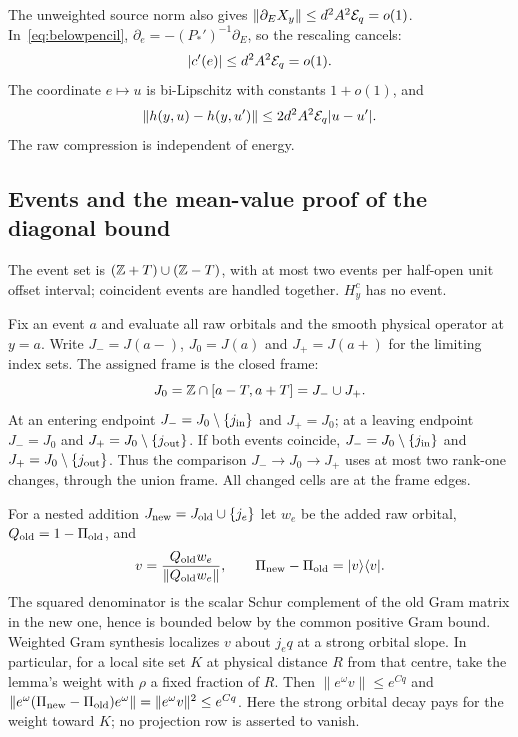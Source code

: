 The unweighted source norm also gives
$\|\partial_EX_y\|\le d^2A^2\mathcal E_q=o(1)$.
In~\eqref{eq:belowpencil}, $\partial_e=-(P_*')^{-1}\partial_E$, so the rescaling cancels:
\[
 |c'(e)|\le d^2A^2\mathcal E_q=o(1).
\]
The coordinate $e\mapsto u$ is bi-Lipschitz with constants $1+o(1)$, and
\begin{equation}\label{eq:belowenergyLip}
 \|h(y,u)-h(y,u')\|\le2d^2A^2\mathcal E_q|u-u'|.
\end{equation}
The raw compression is independent of energy.

\subsection{Events and the mean-value proof of the diagonal bound}
The event set is $(\mathbb Z+T)\cup(\mathbb Z-T)$, with at most two events per half-open unit offset interval; coincident events are handled together. $H_y^c$ has no event.

Fix an event $a$ and evaluate all raw orbitals and the smooth physical operator at $y=a$. Write $J_-=J(a-)$, $J_0=J(a)$ and $J_+=J(a+)$ for the limiting index sets. The assigned frame is the closed frame:
\[
 J_0=\mathbb Z\cap[a-T,a+T]=J_-\cup J_+.
\]
At an entering endpoint $J_-=J_0\setminus\{j_{\rm in}\}$ and $J_+=J_0$; at a leaving endpoint $J_-=J_0$ and $J_+=J_0\setminus\{j_{\rm out}\}$. If both events coincide, $J_-=J_0\setminus\{j_{\rm in}\}$ and $J_+=J_0\setminus\{j_{\rm out}\}$.
Thus the comparison $J_-\to J_0\to J_+$ uses at most two rank-one changes, through the union frame. All changed cells are at the frame edges.

For a nested addition $J_{\rm new}=J_{\rm old}\cup\{j_e\}$ let $w_e$ be the added raw orbital, $Q_{\rm old}=1-\Pi_{\rm old}$, and
\[
 v=\frac{Q_{\rm old}w_e}{\|Q_{\rm old}w_e\|},\qquad
 \Pi_{\rm new}-\Pi_{\rm old}=|v\rangle\langle v|.
\]
The squared denominator is the scalar Schur complement of the old Gram matrix in the new one, hence is bounded below by the common positive Gram bound. Weighted Gram synthesis localizes $v$ about $j_eq$ at a strong orbital slope. In particular, for a local site set $K$ at physical distance $R$ from that centre, take the lemma's weight with $\rho$ a fixed fraction of $R$. Then
$\|e^\omega v\|\le e^{Cq}$ and
$\|e^\omega(\Pi_{\rm new}-\Pi_{\rm old})e^\omega\|
=\|e^\omega v\|^2\le e^{Cq}$.
Here the strong orbital decay pays for the weight toward $K$; no projection row is asserted to vanish.

